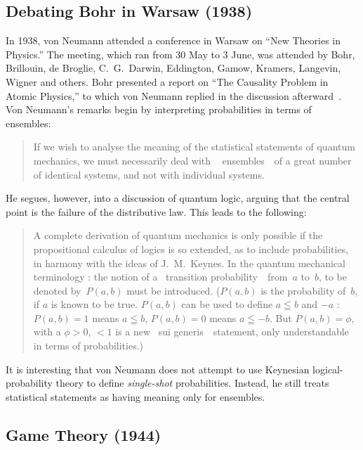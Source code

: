 \documentclass[aps,pra,superscriptaddress,12pt,tightenlines,nofootinbib]{revtex4-2}
\newcommand{\ogm}{\guillemotleft~}
\newcommand{\cgm}{~\guillemotright}
\begin{document}
\subsection{Debating Bohr in Warsaw (1938)}

In 1938, von Neumann attended a conference in Warsaw on ``New Theories
in Physics.''  The meeting, which ran from 30 May to 3 June, was
attended by Bohr, Brillouin, de Broglie, C.\ G.\ Darwin, Eddington,
Gamow, Kramers, Langevin, Wigner and others.  Bohr presented a report
on ``The Causality Problem in Atomic Physics,'' to which von Neumann
replied in the discussion afterward~\cite{VN-WARSAW}.  Von Neumann's
remarks begin by interpreting probabilities in terms of ensembles:
\begin{quotation}
If we wish to analyse the meaning of the statistical statements of
quantum mechanics, we must necessarily deal with \ogm
ensembles\cgm\ of a great number of identical systems, and not with
individual systems.
\end{quotation}
He segues, however, into a discussion of quantum logic, arguing that
the central point is the failure of the distributive law.  This leads
to the following:
\begin{quotation}
A complete derivation of quantum mechanics is only possible if the
propositional calculus of logics is so extended, as to include
probabilities, in harmony with the ideas of J.\ M.\ Keynes.  In the
quantum mechanical terminology : the notion of a \ogm transition
probability\cgm\ from~$a$ to~$b$, to be denoted by~$P(a,b)$ must be
introduced.  ($P(a,b)$ is the probability of~$b$, if $a$ is known to
be true.  $P(a,b)$ can be used to define $a \leqq b$ and $-a$ : $P(a,b)
= 1$ means $a \leqq b$, $P(a,b) = 0$ means $a \leqq -b$.  But $P(a,b) =
\phi$, with a $\phi > 0$, $< 1$ is a new \ogm sui
generis\cgm\ statement, only understandable in terms of
probabilities.)
\end{quotation}

It is interesting that von Neumann does not attempt to use Keynesian
logical-probability theory to define \emph{single-shot}
probabilities.  Instead, he still treats statistical statements as
having meaning only for ensembles.

\subsection{Game Theory (1944)}
\end{document}
